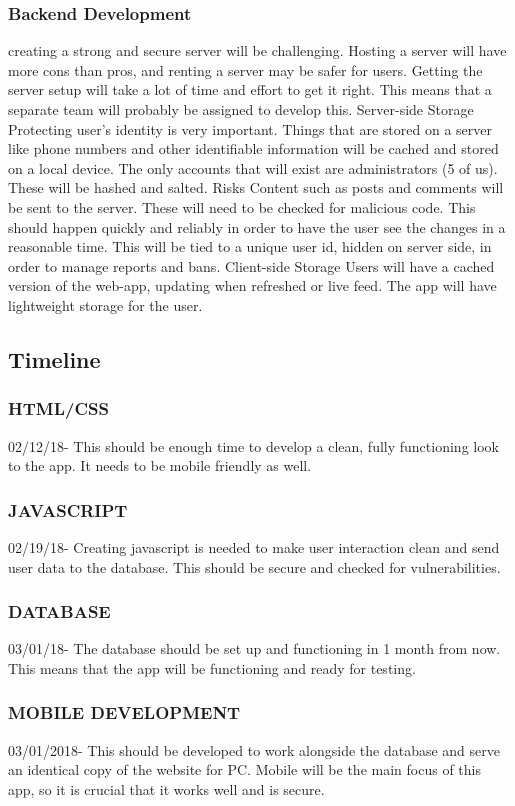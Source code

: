 \documentclass[12pt]{article}
\begin{document}
\subsubsection{Backend Development}
	creating a strong and secure server will be challenging. Hosting a server will have more cons than pros, and renting a server may be safer for users. Getting the server setup will take a lot of time and effort to get it right. This means that a separate team will probably be assigned to 	develop this.
Server-side Storage
	Protecting user’s identity is very important. Things that are stored on a server like phone 	numbers and other identifiable information will be cached and stored on a local device. The 	only accounts that will exist are administrators (5 of us). These will be hashed and salted.
Risks
	Content such as posts and comments will be sent to the server. These will need to be checked for malicious code. This should happen quickly and reliably in order to have the user see the changes in a reasonable time. This will be tied to a unique user id, hidden on server side, in 	order to manage reports and bans.
Client-side Storage
	Users will have a cached version of the web-app, updating when refreshed or live feed. The app will have lightweight storage for the user.

\subsection{Timeline}
\subsubsection{HTML/CSS}
	02/12/18- This should be enough time to develop a clean, fully functioning look to the app. It needs to be mobile friendly as well.
\subsubsection{JAVASCRIPT}
	02/19/18- Creating javascript is needed to make user interaction clean and send user data to the 	database. This should be secure and checked for vulnerabilities.
\subsubsection{DATABASE}
	03/01/18- The database should be set up and functioning in 1 month from now. This means that 	the app will be functioning and ready for testing.
\subsubsection{MOBILE DEVELOPMENT}
	03/01/2018- This should be developed to work alongside the database and serve an identical 	copy of the website for PC. Mobile will be the main focus of this app, so it is crucial that it 	works well and is secure.
\end{document}
